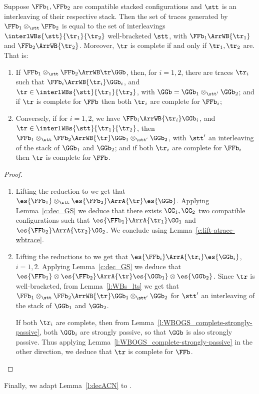 \begin{lemma}
\label{c:dec_GS_WB}
Suppose $\FFb_1,\FFb_2$ are compatible stacked configurations
and $\stt$ is an interleaving of their respective stack.
Then the set of traces generated by $\FFb_1 \otimes_{\stt} \FFb_2$
is equal to the set of interleavings 
$\interlWBs{\stt}{\tr_1}{\tr_2}$ well-bracketed \wrt $\stt$,
with $\FFb_1 \ArrWB{\tr_1}$ and $\FFb_2 \ArrWB{\tr_2}$.
Moreover, $\tr$ is complete if and only if $\tr_1,\tr_2$ are.
That is:
\begin{enumerate}
  \item If $\FFb_1 \otimes_{\stt} \FFb_2 \ArrWB \tr  \GGb$, then, 
  for $i=1,2$,  there are traces $\tr_i$
  such that ${\FFb_i}\ArrWB{\tr_i} \GGb_i$, 
  and $\tr \in \interlWBs{\stt}{\tr_1}{\tr_2}$, 
  with $\GGb = \GGb_1 \otimes_{\stt'} \GGb_2$;
  and if $\tr$ is complete for $\FFb$ then both $\tr_i$ are complete for $\FFb_i$;
  \item Conversely, if for  $i=1,2$, we have
  ${\FFb_i} \ArrWB {\tr_i} \GGb_i$,  
  and $\tr \in \interlWBs{\stt}{\tr_1}{\tr_2}$, 
  then $\FFb_1 \otimes_{\stt} \FFb_2 \ArrWB{\tr} 
  \GGb_1 \otimes_{\stt'} \GGb_2$, with $\stt'$
  an interleaving of the stack of $\GGb_1$ and $\GGb_2$;
  and if both $\tr_i$ are complete for $\FFb_i$ then $\tr$ is complete for $\FFb$.
\end{enumerate} 
\end{lemma}

\begin{proof}
  \begin{enumerate}
    \item Lifting the reduction to \AOGS we get that
    $\es{\FFb_1} \otimes_{\stt} \es{\FFb_2} \ArrA{\tr} \es{\GGb}$.
    Applying Lemma~\ref{c:dec_GS} we deduce that there exists
    $\GG_1,\GG_2$ two compatible \AOGS configurations
    such that $\es{\FFb_1} \ArrA{\tr_1} \GG_1$
    and $\es{\FFb_2} \ArrA{\tr_2} \GG_2$.
    We conclude using Lemma~\ref{c:lift-atrace-wbtrace}.
    \item Lifting the reductions to \AOGS we get that
    ${\es{\FFb_i}} \ArrA {\tr_i} \es{\GGb_i}$, $i=1,2$.
    Applying Lemma~\ref{c:dec_GS} we deduce that 
    $\es{\FFb_1} \otimes \es{\FFb_2} \ArrA{\tr} \es{\GGb_1} \otimes \es{\GGb_2}$.
    Since $\tr$ is well-bracketed,
    from Lemma~\ref{l:WBs_lts}
    we get that
    $\FFb_1 \otimes_{\stt} \FFb_2 \ArrWB{\tr} 
     \GGb_1 \otimes_{\stt'} \GGb_2$
    for $\stt'$
    an interleaving of the stack of $\GGb_1$ and $\GGb_2$.

\noindent
    If both $\tr_i$ are complete, then from Lemma~\ref{l:WBOGS_complete-strongly-passive},
    both $\GGb_i$ are strongly passive, so that $\GGb$ is also strongly passive.
    Thus applying Lemma~\ref{l:WBOGS_complete-strongly-passive} in the other direction, 
    we deduce that $\tr$ is complete for $\FFb$.
    \qedhere
  \end{enumerate}
\end{proof}
\noindent
Finally, we adapt Lemma~\ref{l:decACN} to \WBOGS.


